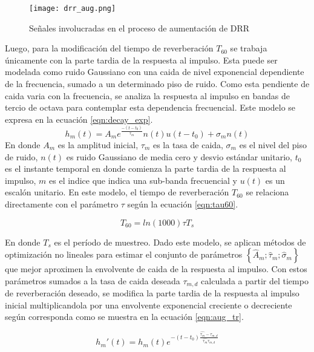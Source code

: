\begin{figure}[H]
	\centering{}
	\texttt{[image: drr\_aug.png]}
	\caption{Señales involucradas en el proceso de aumentación de DRR}
	\label{fig:drr_aug}
\end{figure}

Luego, para la modificación del tiempo de reverberación $T_{60}$ se trabaja únicamente con la parte tardia de la respuesta al impulso. Esta puede ser modelada como ruido Gaussiano con una caida de nivel exponencial dependiente de la frecuencia, sumado a un determinado piso de ruido. Como esta pendiente de caida varia con la frecuencia, se analiza la respuesta al impulso en bandas de tercio de octava para contemplar esta dependencia frecuencial. Este modelo se expresa en la ecuación \ref{eqn:decay_exp}. 
\begin{equation}
\label{eqn:decay_exp}
	h_{m}(t) = A_{m} e^{\frac{-(t-t_{0})}{\tau_{m}}}n(t)u(t-t_{0})+\sigma_{m}n(t)
\end{equation} 
En donde $A_{m}$ es la amplitud inicial, $\tau_{m}$ es la tasa de caida, $\sigma_{m}$ es el nivel del piso de ruido, $n(t)$ es ruido Gaussiano de media cero y desvio estándar unitario, $t_{0}$ es el instante temporal en donde comienza la parte tardia de la respuesta al impulso, $m$ es el indice que indica una sub-banda frecuencial y $u(t)$ es un escalón unitario. En este modelo, el tiempo de reverberación $T_{60}$ se relaciona directamente con el parámetro $\tau$ según la ecuación \ref{eqn:tau60}.

\begin{equation}
\label{eqn:tau60}
	T_{60} = ln(1000)\tau T_{s}
\end{equation}

En donde $T_{s}$ es el período de muestreo. Dado este modelo, se aplican métodos de optimización no lineales para estimar el conjunto de parámetros $\left \{ \hat{A}_{m}; \hat{\tau}_{m}; \hat{\sigma}_{m} \right \}$ que mejor aproximen la envolvente de caida de la respuesta al impulso. Con estos parámetros sumados a la tasa de caida deseada $\tau_{m,d}$ calculada a partir del tiempo de reverberación deseado, se modifica la parte tardia de la respuesta al impulso inicial multiplicandola por una envolvente exponencial creciente o decreciente según corresponda como se muestra en la ecuación  \ref{eqn:aug_tr}.

\begin{equation}
\label{eqn:aug_tr}
	{h_{m}}'(t) = h_{m}(t) e^{-(t-t_{0})\frac{\hat{\tau_{m}}-\tau_{m,d}}{\hat{\tau_{m}}\tau_{m,d}}}
\end{equation}

